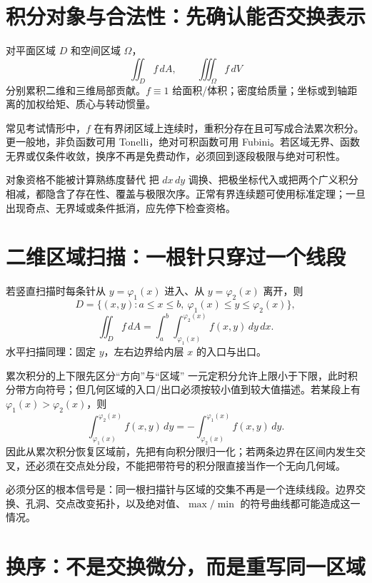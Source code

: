 \documentclass[11pt,a4paper,fontset=fandol]{ctexart}
\begin{document}
\section{积分对象与合法性：先确认能否交换表示}

对平面区域 $D$ 和空间区域 $\Omega$，
\[
\iint_D f\,dA,
\qquad
\iiint_\Omega f\,dV
\]
分别累积二维和三维局部贡献。$f\equiv1$ 给面积/体积；密度给质量；坐标或到轴距离的加权给矩、质心与转动惯量。

常见考试情形中，$f$ 在有界闭区域上连续时，重积分存在且可写成合法累次积分。更一般地，非负函数可用 Tonelli，绝对可积函数可用 Fubini。若区域无界、函数无界或仅条件收敛，换序不再是免费动作，必须回到逐段极限与绝对可积性。

\begin{warnbox}{对象资格不能被计算熟练度替代}
把 $dx\,dy$ 调换、把极坐标代入或把两个广义积分相减，都隐含了存在性、覆盖与极限次序。正常有界连续题可使用标准定理；一旦出现奇点、无界域或条件抵消，应先停下检查资格。
\end{warnbox}

\section{二维区域扫描：一根针只穿过一个线段}

若竖直扫描时每条针从 $y=\varphi_1(x)$ 进入、从 $y=\varphi_2(x)$ 离开，则
\[
D=\{(x,y):a\le x\le b,\ \varphi_1(x)\le y\le\varphi_2(x)\},
\]
\[
\iint_D f\,dA=\int_a^b\int_{\varphi_1(x)}^{\varphi_2(x)}f(x,y)\,dy\,dx.
\]
水平扫描同理：固定 $y$，左右边界给内层 $x$ 的入口与出口。

\begin{warnbox}{累次积分的上下限先区分“方向”与“区域”}
一元定积分允许上限小于下限，此时积分带方向符号；但几何区域的入口/出口必须按较小值到较大值描述。若某段上有 $\varphi_1(x)>\varphi_2(x)$，则
\[
\int_{\varphi_1(x)}^{\varphi_2(x)}f(x,y)\,dy
=-\int_{\varphi_2(x)}^{\varphi_1(x)}f(x,y)\,dy.
\]
因此从累次积分恢复区域前，先把有向积分限归一化；若两条边界在区间内发生交叉，还必须在交点处分段，不能把带符号的积分限直接当作一个无向几何域。
\end{warnbox}

必须分区的根本信号是：同一根扫描针与区域的交集不再是一个连续线段。边界交换、孔洞、交点改变拓扑，以及绝对值、$\max/\min$ 的符号曲线都可能造成这一情况。

\section{换序：不是交换微分，而是重写同一区域}
\end{document}
